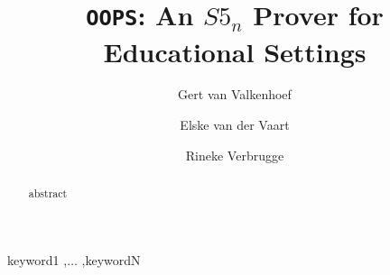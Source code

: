 \documentclass[preprint]{elsarticle}
\newcommand{\oops}{\texttt{OOPS}}
\begin{document}
\begin{frontmatter}
\title{\oops: An $S5_n$ Prover for Educational Settings}

\author[gert]{Gert van Valkenhoef}
\author[ai,tb]{Elske van der Vaart}
\author[ai]{Rineke Verbrugge}

\address[gert]{Department of Business and ICT, University of Groningen,\\
P.O. Box 800, 9700 AV, Groningen, The Netherlands}

\address[ai]{Department of Artificial Intelligence, University of Groningen,\\
P.O. Box 407, 9700 AK, Groningen, The Netherlands}

\address[tb]{Theoretical Biology Group, University of Groningen,\\
P.O. Box 14, 9750 AA, Haren, The Netherlands}

\begin{abstract}
abstract
\end{abstract}

\begin{keyword}
keyword1 \sep $\dots$ \sep keywordN
\end{keyword}

\end{frontmatter}












\end{document}
